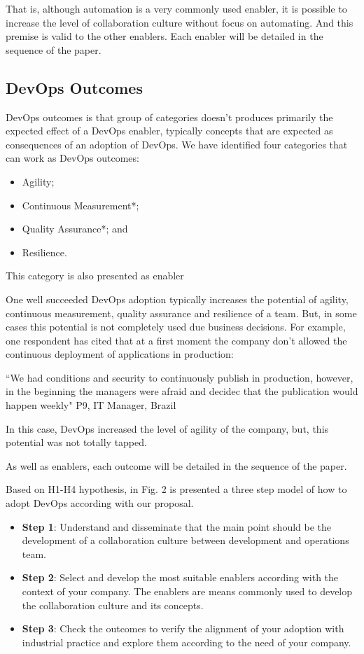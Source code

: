 That is, although automation is a very commonly used enabler, it is possible to
increase the level of collaboration culture without focus on automating. And
this premise is valid to the other enablers. Each enabler will be detailed in
the sequence of the paper.

\subsection{DevOps Outcomes}
DevOps outcomes is that group of categories doesn't produces primarily the
expected effect of a DevOps enabler, typically concepts that are expected as
consequences of an adoption of DevOps. We have identified four categories that
can work as DevOps outcomes:

\begin{itemize}
\item Agility;
\item Continuous Measurement*;
\item Quality Assurance*; and
\item Resilience.
\end{itemize}

\footnotesize * This category is also presented as enabler


\normalsize
One well succeeded DevOps adoption typically increases the potential of
agility, continuous measurement, quality assurance and resilience of a team.
But, in some cases this potential is not completely used due business
decisions. For example, one respondent has cited that at a first moment the
company don't allowed the continuous deployment of applications in production:

``We had conditions and security to continuously publish in production,
however, in the beginning the managers were afraid and decidec that the
publication would happen weekly" P9, IT Manager, Brazil

In this case, DevOps increased the level of agility of the company, but, this
potential was not totally tapped.

As well as enablers, each outcome will be detailed in the sequence of the paper.

Based on H1-H4 hypothesis, in Fig. 2 is presented a three step model of how to
adopt DevOps according with our proposal.

\begin{itemize}
\item \textbf{Step 1}: Understand and disseminate that the main point should be
the development of a collaboration culture between development and operations
team.
\item \textbf{Step 2}: Select and develop the most suitable enablers according
with the context of your company. The enablers are means commonly used to
develop the collaboration culture and its concepts.
\item \textbf{Step 3}: Check the outcomes to verify the alignment of your
adoption with industrial practice and explore them according to the need of
your company.
\end{itemize}

